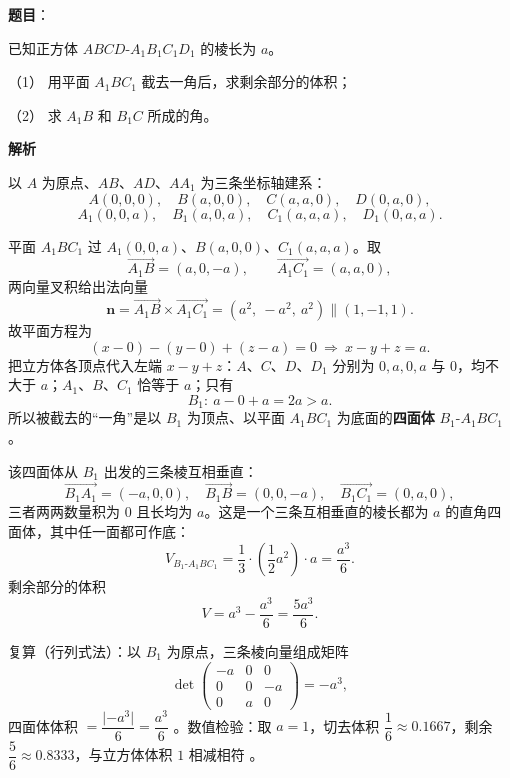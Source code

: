 \begin{answer}

\textbf{题目}：

已知正方体 $ABCD\text{-}A_1B_1C_1D_1$ 的棱长为 $a$。

（1） 用平面 $A_1BC_1$ 截去一角后，求剩余部分的体积；

（2） 求 $A_1B$ 和 $B_1C$ 所成的角。

\textbf{解析}

以 $A$ 为原点、$AB$、$AD$、$AA_1$ 为三条坐标轴建系：
\nopagebreak[4]
\[
A(0,0,0),\quad B(a,0,0),\quad C(a,a,0),\quad D(0,a,0),
\]
\nopagebreak[4]
\[
A_1(0,0,a),\quad B_1(a,0,a),\quad C_1(a,a,a),\quad D_1(0,a,a).
\]


平面 $A_1BC_1$ 过 $A_1(0,0,a)$、$B(a,0,0)$、$C_1(a,a,a)$。取
\nopagebreak[4]
\[
\overrightarrow{A_1B}=(a,0,-a),\qquad \overrightarrow{A_1C_1}=(a,a,0),
\]
两向量叉积给出法向量
\nopagebreak[4]
\[
\mathbf n=\overrightarrow{A_1B}\times\overrightarrow{A_1C_1}=(a^2,\ -a^2,\ a^2)\parallel(1,-1,1).
\]
故平面方程为
\nopagebreak[4]
\[
(x-0)-(y-0)+(z-a)=0\ \Longrightarrow\ x-y+z=a.
\]
把立方体各顶点代入左端 $x-y+z$：$A$、$C$、$D$、$D_1$ 分别为 $0,a,0,a$ 与 $0$，均不大于 $a$；$A_1$、$B$、$C_1$ 恰等于 $a$；只有
\nopagebreak[4]
\[
B_1:\ a-0+a=2a>a.
\]
所以被截去的“一角”是以 $B_1$ 为顶点、以平面 $A_1BC_1$ 为底面的\textbf{四面体} $B_1\text{-}A_1BC_1$。

该四面体从 $B_1$ 出发的三条棱互相垂直：
\nopagebreak[4]
\[
\overrightarrow{B_1A_1}=(-a,0,0),\quad \overrightarrow{B_1B}=(0,0,-a),\quad \overrightarrow{B_1C_1}=(0,a,0),
\]
三者两两数量积为 $0$ 且长均为 $a$。这是一个三条互相垂直的棱长都为 $a$ 的直角四面体，其中任一面都可作底：
\nopagebreak[4]
\[
V_{B_1\text{-}A_1BC_1}=\frac13\cdot\left(\frac12a^2\right)\cdot a=\frac{a^3}{6}.
\]
剩余部分的体积
\nopagebreak[4]
\[
V=a^3-\frac{a^3}{6}=\frac{5a^3}{6}.
\]

复算（行列式法）：以 $B_1$ 为原点，三条棱向量组成矩阵
\nopagebreak[4]
\[
\det\begin{pmatrix}-a&0&0\\0&0&-a\\0&a&0\end{pmatrix}=-a^3,
\]
四面体体积 $=\dfrac{\lvert-a^3\rvert}{6}=\dfrac{a^3}{6}$ 。数值检验：取 $a=1$，切去体积 $\dfrac16\approx0.1667$，剩余 $\dfrac56\approx0.8333$，与立方体体积 $1$ 相减相符 。


\end{answer}
